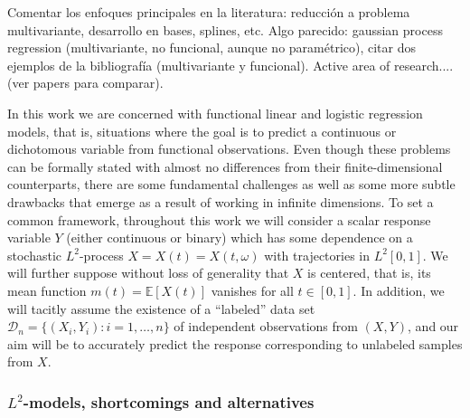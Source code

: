 \documentclass[ba]{imsart}
\numberwithin{equation}{section}
\theoremstyle{plain}
\newcommand{\E}{\mathbb{E}}
\newenvironment{comment}[1][comment-red]
{
\noindent \color{#1}
}
{
\color{black}
}
\begin{document}
\begin{comment}
Comentar los enfoques principales en la literatura: reducción a problema multivariante, desarrollo en bases, splines, etc. Algo parecido: gaussian process regression (multivariante, no funcional, aunque no paramétrico), citar dos ejemplos de la bibliografía (multivariante y funcional). Active area of research.... (ver papers para comparar).
\end{comment}

In this work we are concerned with functional linear and logistic regression models, that is, situations where the goal is to predict a continuous or dichotomous variable from functional observations. Even though these problems can be formally stated with almost no differences from their finite-dimensional counterparts, there are some fundamental challenges as well as some more subtle drawbacks that emerge as a result of working in infinite dimensions. To set a common framework, throughout this work we will consider a scalar response variable \(Y\) (either continuous or binary) which has some dependence on a stochastic \(L^2\)-process \(X=X(t)=X(t, \omega)\) with trajectories in \(L^2[0, 1]\). We will further suppose without loss of generality that \(X\) is centered, that is, its mean function \(m(t)=\E[X(t)]\) vanishes for all \(t\in[0,1]\). In addition, we will tacitly assume the existence of a ``labeled'' data set \(\mathcal D_n =\{(X_i, Y_i): i=1,\dots, n\}\) of independent observations from \((X, Y)\), and our aim will be to accurately predict the response corresponding to unlabeled samples from \(X\).

\subsubsection{\(L^2\)-models, shortcomings and alternatives}
\end{document}
